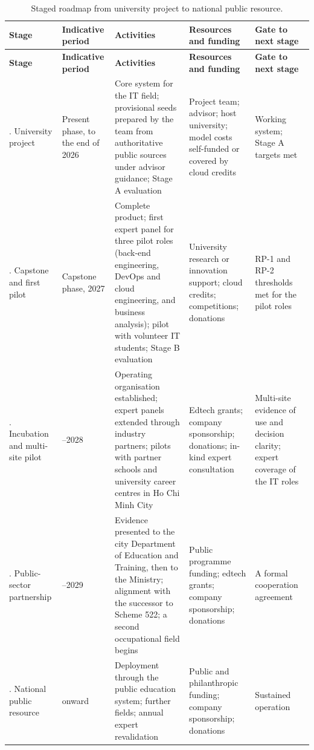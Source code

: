{\small
\begin{longtable}{|>{\raggedright\arraybackslash}p{}|>{\raggedright\arraybackslash}p{}|>{\raggedright\arraybackslash}p{}|>{\raggedright\arraybackslash}p{}|>{\raggedright\arraybackslash}p{}|}
\caption{Staged roadmap from university project to national public resource.} \\
\hline
\textbf{Stage} & \textbf{Indicative period} & \textbf{Activities} & \textbf{Resources and funding} & \textbf{Gate to next stage} \\ \hline
\endfirsthead
\hline
\textbf{Stage} & \textbf{Indicative period} & \textbf{Activities} & \textbf{Resources and funding} & \textbf{Gate to next stage} \\ \hline
\endhead
0. University project & Present phase, to the end of 2026 & Core system for the IT field; provisional seeds prepared by the team from authoritative public sources under advisor guidance; Stage A evaluation & Project team; advisor; host university; model costs self-funded or covered by cloud credits & Working system; Stage A targets met \\ \hline
1. Capstone and first pilot & Capstone phase, 2027 & Complete product; first expert panel for three pilot roles (back-end engineering, DevOps and cloud engineering, and business analysis); pilot with volunteer IT students; Stage B evaluation & University research or innovation support; cloud credits; competitions; donations & RP-1 and RP-2 thresholds met for the pilot roles \\ \hline
2. Incubation and multi-site pilot & 2027--2028 & Operating organisation established; expert panels extended through industry partners; pilots with partner schools and university career centres in Ho Chi Minh City & Edtech grants; company sponsorship; donations; in-kind expert consultation & Multi-site evidence of use and decision clarity; expert coverage of the IT roles \\ \hline
3. Public-sector partnership & 2028--2029 & Evidence presented to the city Department of Education and Training, then to the Ministry; alignment with the successor to Scheme 522; a second occupational field begins & Public programme funding; edtech grants; company sponsorship; donations & A formal cooperation agreement \\ \hline
4. National public resource & 2030 onward & Deployment through the public education system; further fields; annual expert revalidation & Public and philanthropic funding; company sponsorship; donations & Sustained operation \\ \hline
\end{longtable}
}

